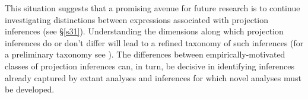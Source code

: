 \documentclass[11pt,fleqn]{article}
\newcommand{\6}{\mbox{$[\hspace*{-.6mm}[$}}
\newcommand{\9}{\mbox{$]\hspace*{-.6mm}]$}}
\begin{document}
This situation suggests that a promising avenue for future research is to continue investigating distinctions between expressions associated with projection inferences (see \S\ref{s31}).  Understanding the dimensions along which projection inferences do or don't differ will lead to a refined taxonomy of such inferences (for a preliminary taxonomy see \citealt{brst-lang11}). The differences between empirically-motivated classes of projection inferences can, in turn, be decisive in identifying inferences already captured by extant analyses and inferences for which novel analyses must be developed.



\end{document}
